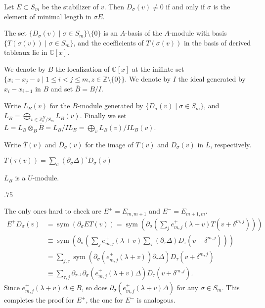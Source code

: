 \documentclass[11pt,fleqn]{article}
\makeatletter
\newcounter{para}[section]
\renewenvironment{proof}[1][\textit{Proof}]{\par
  \pushQED{\qed}%
  \normalfont \topsep.75\paraskip\relax
  \trivlist
  \item[\hskip\labelsep
        \itshape
    #1\@addpunct{.}]\ignorespaces
}{%
  \popQED\endtrivlist\@endpefalse
}
\newcommand\CC{\mathbb C}
\newcommand\ZZ{\mathbb Z}
\newcommand\ot{\otimes}
\DeclareMathOperator\sym{sym}
\makeatother
\begin{document}
Let $E \subset S_m$ be the stabilizer of $v$. Then $D_\sigma(v) \neq 0$ if and 
only if $\sigma$ is the element of minimal length in $\sigma E$.

The set $\{D_\sigma(v) \mid \sigma \in S_m\} \setminus \{0\}$ is an
$A$-basis of the $A$-module with basis $\{T(\sigma(v)) \mid \sigma \in S_m\}$,
and the coefficients of $T(\sigma(v))$ in the basis of derived tableaux lie in
$\CC[x]$.

We denote by $B$ the localization of $\CC[x]$ at the inifinte set $\{x_i - x_j 
- z \mid 1 \leq i < j \leq m, z \in \ZZ \setminus \{0\}\}$. We denote by $I$ 
the ideal generated by $x_i - x_{i+1}$ in $B$ and set $\overline B = B/I$.

\begin{Definition}
Write $L_B(v)$ for the $B$-module generated by $\{D_\sigma(v) \mid \sigma \in 
S_m\}$, and $L_B = \bigoplus_{v \in \ZZ^N_0/S_m} L_B(v)$. Finally we set
$L = L_B \ot_B \overline B = L_B/I L_B = \bigoplus_v L_B(v) / I L_B(v)$.
\end{Definition}

Write $\overline T(v)$ and $\overline D_\sigma(v)$ for the image of 
$T(v)$ and $D_\sigma(v)$ in $L$, respectively.

\begin{Lemma}
$\overline T(\tau(v)) = \sum_\sigma (\partial_\sigma \Delta)^\tau \overline 
D_\sigma(v)$
\end{Lemma}

\begin{Lemma}
$L_B$ is a $U$-module.
\end{Lemma}
\begin{proof}
The only ones hard to check are $E^+ = E_{m,m+1}$ and $E^- = E_{m+1,m}$.
\begin{align*}
E^+ D_\sigma(v)
  &= \sym (\partial_\sigma E T(v))
  = \sym\left(
    \partial_\sigma 
      \left(
        \sum_j e_{m,j}^+(\lambda + v) T(v + \delta^{m,j})
      \right)
    \right)\\
  & \equiv \sym \left(
      \partial_\sigma \left(
        \sum_j e_{m,j}^+(\lambda + v) 
        \sum_\tau (\partial_\tau \Delta) D_\tau (v + \delta^{m,j})
      \right)
    \right) \\
  &= \sum_{j,\tau} \sym(\partial_\sigma (e_{m,j}^+(\lambda+v)) 
    \partial_{\tau} \Delta) D_\tau(v+\delta^{m,j}) \\
  &\equiv \sum_{\tau, j}  \partial_{\tau^{-1}} 
      \partial_\sigma (e_{m,j}^+(\lambda + v) \Delta) D_\tau(v+\delta^{m,j}).
\end{align*}
Since $e_{m,j}^+(\lambda + v) \Delta \in B$, so does 
$\partial_\sigma(e_{m,j}^+(\lambda + v) \Delta)$ for any $\sigma \in S_m$.
This completes the proof for $E^+$, the one for $E^-$ is analogous.
\end{proof}
\end{document}
